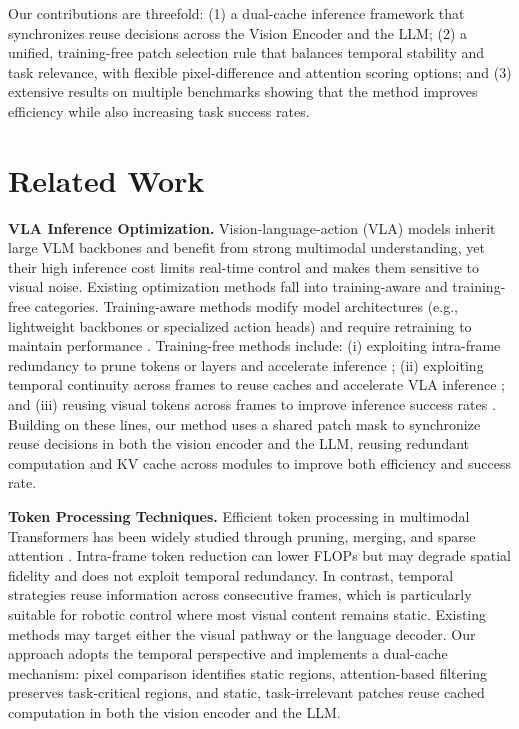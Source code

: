 \documentclass[11pt]{article}
\begin{document}
Our contributions are threefold: (1) a dual-cache inference framework that synchronizes reuse decisions across the Vision Encoder and the LLM; (2) a unified, training-free patch selection rule that balances temporal stability and task relevance, with flexible pixel-difference and attention scoring options; and (3) extensive results on multiple benchmarks showing that the method improves efficiency while also increasing task success rates.

\section{Related Work}
\noindent\textbf{VLA Inference Optimization.}
Vision-language-action (VLA) models inherit large VLM backbones and benefit from strong multimodal understanding, yet their high inference cost limits real-time control and makes them sensitive to visual noise. Existing optimization methods fall into training-aware and training-free categories. Training-aware methods modify model architectures (e.g., lightweight backbones or specialized action heads) and require retraining to maintain performance \citep{wen2024tinyvla,DeeR-VLA,zhang2025mole,liu2024robomamba}. Training-free methods include: (i) exploiting intra-frame redundancy to prune tokens or layers and accelerate inference \citep{yang2025efficientvla}; (ii) exploiting temporal continuity across frames to reuse caches and accelerate VLA inference \citep{xu2025vla}; and (iii) reusing visual tokens across frames to improve inference success rates \citep{liu2025ttf}. Building on these lines, our method uses a shared patch mask to synchronize reuse decisions in both the vision encoder and the LLM, reusing redundant computation and KV cache across modules to improve both efficiency and success rate.

\noindent\textbf{Token Processing Techniques.}
Efficient token processing in multimodal Transformers has been widely studied through pruning, merging, and sparse attention \citep{chen2024image,zhang2024sparsevlm,bolya2022token,cao2023pumer,dynamicvit2021,adavit2022,evit2022}. Intra-frame token reduction can lower FLOPs but may degrade spatial fidelity and does not exploit temporal redundancy. In contrast, temporal strategies reuse information across consecutive frames, which is particularly suitable for robotic control where most visual content remains static. Existing methods may target either the visual pathway or the language decoder. Our approach adopts the temporal perspective and implements a dual-cache mechanism: pixel comparison identifies static regions, attention-based filtering preserves task-critical regions, and static, task-irrelevant patches reuse cached computation in both the vision encoder and the LLM.
\end{document}
